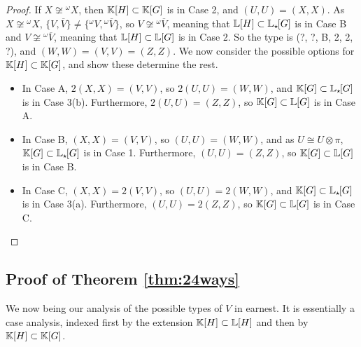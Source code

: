 \begin{proof}
    If $X \not\cong {}^{\omega}X$, then ${\mathbb K}[H] \subset {\mathbb K}[G]$ is in Case 2, and $(U,U) = (X,X)$. As $X \not\cong {}^{\omega}X$, $\{V, \overline{V}\} \neq \{{}^{\omega}V, {}^{\omega}\overline{V}\}$, so $V \not\cong {}^{\omega} \overline{V}$, meaning that ${\mathbb L}[H] \subset {\mathbb L}_{\star \hspace{-0.1em}}[G]$ is in Case B and $V \not\cong {}^{\omega} \overline{V}$, meaning that ${\mathbb L}[H] \subset {\mathbb L}[G]$ is in Case 2. So the type is (?, ?, B, 2, 2, ?), and $(W,W) = (V,V) = (Z,Z)$. We now consider the possible options for ${\mathbb K}[H] \subset {\mathbb K}[G]$, and show these determine the rest.
    \begin{itemize}
        \item In Case A, $2(X,X) = (V,V)$, so $2(U,U) = (W,W)$, and ${\mathbb K}[G] \subset {\mathbb L}_{\star \hspace{-0.1em}}[G]$ is in Case 3(b). Furthermore, $2(U,U) = (Z,Z)$, so ${\mathbb K}[G] \subset {\mathbb L}[G]$ is in Case A.
        \item In Case B, $(X,X) = (V,V)$, so $(U,U) = (W,W)$, and as $U \cong U \otimes \pi$, ${\mathbb K}[G] \subset {\mathbb L}_{\star \hspace{-0.1em}}[G]$ is in Case 1. Furthermore, $(U,U) = (Z,Z)$, so ${\mathbb K}[G] \subset {\mathbb L}[G]$ is in Case B.
        \item In Case C, $(X,X) = 2(V,V)$, so $(U,U) = 2(W,W)$, and ${\mathbb K}[G] \subset {\mathbb L}_{\star \hspace{-0.1em}}[G]$ is in Case 3(a). Furthermore, $(U,U) = 2(Z,Z)$, so ${\mathbb K}[G] \subset {\mathbb L}[G]$ is in Case C. \qedhere
    \end{itemize}
\end{proof}

\subsection{Proof of Theorem \ref{thm:24ways}} We now being our analysis of the possible types of $V$ in earnest. It is essentially a case analysis, indexed first by the extension ${\mathbb K}[H] \subset {\mathbb L}[H]$ and then by ${\mathbb K}[H] \subset {\mathbb K}[G]$.

